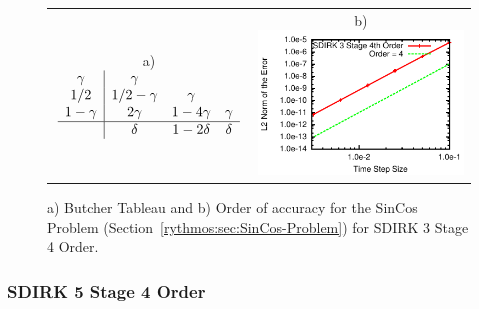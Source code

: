 \begin{figure}[H]
\centering{}%
\begin{tabular}{cc}
a)$\begin{array}{c|ccc}
\gamma & \gamma\\
1/2 & 1/2-\gamma & \gamma\\
1-\gamma & 2\gamma & 1-4\gamma & \gamma\\
\hline  & \delta & 1-2\delta & \delta
\end{array}$ & b)\includegraphics[scale=1.5]{figures/SDIRK_3Stage4Order}\tabularnewline
\end{tabular}\caption{a) Butcher Tableau and b) Order of accuracy for the SinCos Problem
(Section~\ref{rythmos:sec:SinCos-Problem}) for SDIRK 3 Stage 4 Order.}
\end{figure}



\subsubsection{SDIRK 5 Stage 4 Order}

